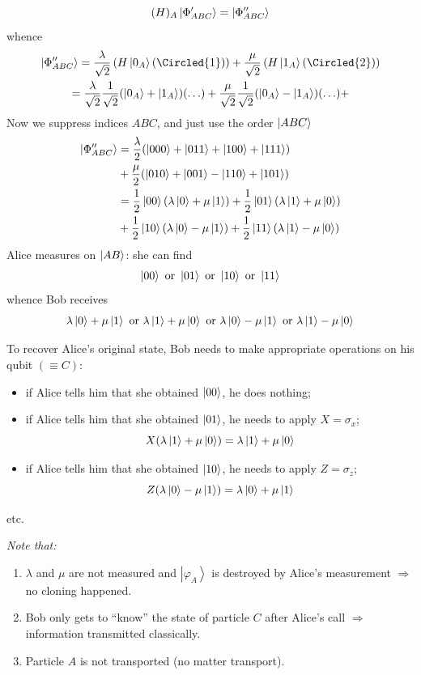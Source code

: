 \documentclass[12pt]{article}
\newcommand{\be}{\begin{equation}}
\newcommand{\ee}{\end{equation}}
\begin{document}
\[
(H)_A \ket{\Phi^\prime_{ABC}} = \ket{\Phi^{\prime\prime}_{ABC}}
\]
whence
\[
\begin{gathered}
\ket{\Phi^{\prime\prime}_{ABC}} = 
\frac{\lambda}{\sqrt 2}
\left(
H\ket{0_A}(\Circled{1})
\right)
+
\frac{\mu}{\sqrt 2}
\left(
H\ket{1_A}(\Circled{2})
\right)\\
=
\frac{\lambda}{\sqrt 2}\frac{1}{\sqrt 2}(\ket{0_A} + \ket{1_A})(\ldots) +
\frac{\mu}    {\sqrt 2}\frac{1}{\sqrt 2}(\ket{0_A} - \ket{1_A})(\ldots) +
\end{gathered}
\]
Now we suppress indices $ABC$, and just use the order $\ket{ABC}$
\be
\begin{aligned}
\ket{\Phi^{\prime\prime}_{ABC}}
&= \frac{\lambda}{2} (\ket{000} + \ket{011} + \ket{100} + \ket{111})\\
&+ \frac{\mu}{2}     (\ket{010} + \ket{001} - \ket{110} + \ket{101})\\
&= \frac{1}{2} \ket{00} (\lambda\ket{0} + \mu\ket{1}) 
 + \frac{1}{2} \ket{01} (\lambda\ket{1} + \mu\ket{0})\\
&+ \frac{1}{2} \ket{10} (\lambda\ket{0} - \mu\ket{1}) 
 + \frac{1}{2} \ket{11} (\lambda\ket{1} - \mu\ket{0})\\
\end{aligned}
\ee
Alice measures on $\ket{AB}$: she can find
\be
\ket{00} \text { or }
\ket{01} \text { or }
\ket{10} \text { or }
\ket{11}
\ee
whence Bob receives
\[
\lambda\ket{0} + \mu\ket{1} \text { or }
\lambda\ket{1} + \mu\ket{0} \text { or }
\lambda\ket{0} - \mu\ket{1} \text { or }
\lambda\ket{1} - \mu\ket{0} 
\]

To recover Alice's original state, Bob needs to
make appropriate operations on his qubit \((\equiv C)\):
\begin{itemize}
\item if Alice tells him that she obtained $\ket{00}$,
he does nothing;
\item if Alice tells him that she obtained $\ket{01}$,
he needs to apply $X = \sigma_x$;
\be
X(\lambda\ket{1} + \mu\ket{0}) = \lambda\ket{1} + \mu\ket{0}
\ee
%
\item if Alice tells him that she obtained $\ket{10}$,
he needs to apply $Z = \sigma_z$;
\[
Z(\lambda\ket{0} - \mu\ket{1}) = \lambda\ket{0} + \mu\ket{1}
\]
\end{itemize}
etc.

\emph{Note that:}
\begin{enumerate}
\item \(\lambda\) and \(\mu\) are not measured and \(\left|\varphi_{A}\right\rangle\) is destroyed
by Alice's measurement \(\Rightarrow\) no cloning happened.
\item Bob only gets to ``know'' the state of particle $C$
after Alice's call $\Rightarrow$ information transmitted classically.
\item Particle $A$ is not transported (no matter transport).
\end{enumerate}
\end{document}

